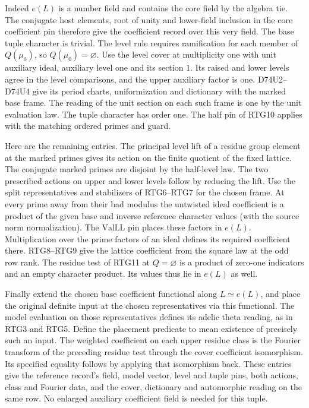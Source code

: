 Indeed $e(L)$ is a number field and contains the core field by
the algebra tie. The conjugate host elements, root of unity and
lower-field inclusion in the core coefficient pin therefore give
the coefficient record over this very field. The base tuple
character is trivial. The level rule requires ramification for each
member of $Q(\mu_0)$, so $Q(\mu_0)=\varnothing$. Use the level
cover at multiplicity one with unit auxiliary ideal, auxiliary level
one and its section $1$. Its raised and lower levels agree in the
level comparisons, and the upper auxiliary factor is one.
D74U2--D74U4 give its period charts, uniformization and dictionary
with the marked base frame. The reading of the unit section on each
such frame is one by the unit evaluation law. The tuple character
has order one. The half pin of RTG10 applies with the matching
ordered primes and guard.

Here are the remaining entries. The principal level lift of a
residue group element at the marked primes gives its action on
the finite quotient of the fixed lattice. The conjugate marked
primes are disjoint by the half-level law. The two prescribed
actions on upper and lower levels follow by reducing the lift.
Use the split representatives and stabilizers of RTG6--RTG7
for the chosen frame. At every prime away from their bad modulus
the untwisted ideal coefficient is a product of the given base
and inverse reference character values (with the source norm
normalization). The $\mathrm{ValLL}$ pin places these factors
in $e(L)$. Multiplication over the prime factors of an ideal
defines its required coefficient there. RTG8--RTG9 give the
lattice coefficient from the square law at the odd row rank.
The residue test of RTG11 at $Q=\varnothing$ is a product of
zero-one indicators and an empty character product. Its values
thus lie in $e(L)$ as well.

Finally extend the chosen base coefficient functional along
$L\simeq e(L)$, and place the original definite input at the
chosen representatives via this functional. The model evaluation
on those representatives defines its adelic theta reading, as in
RTG3 and RTG5. Define the placement predicate to mean existence
of precisely such an input. The weighted coefficient on each
upper residue class is the Fourier transform of the preceding
residue test through the cover coefficient isomorphism. Its
specified equality follows by applying that isomorphism back.
These entries give the reference record's field, model vector,
level and tuple pins, both actions, class and Fourier data, and
the cover, dictionary and automorphic reading on the same row.
No enlarged auxiliary coefficient field is needed for this tuple.


